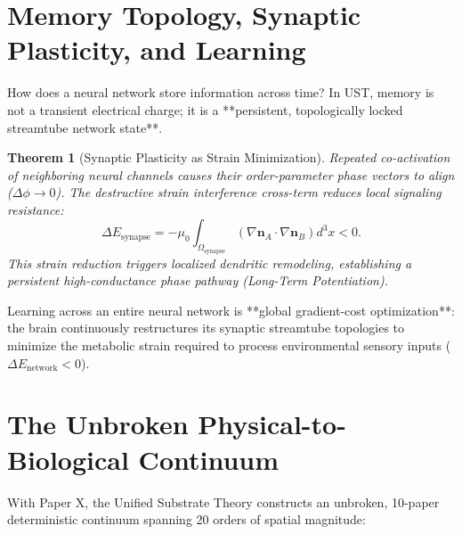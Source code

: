 \documentclass[11pt,a4paper]{article}
\newtheorem{thm}{Theorem}
\begin{document}
	\section{Memory Topology, Synaptic Plasticity, and Learning}
	\label{sec:memory_learning}
	
	How does a neural network store information across time? In UST, memory is not a transient electrical charge; it is a **persistent, topologically locked streamtube network state**.
	
	\begin{thm}[Synaptic Plasticity as Strain Minimization]
		\label{thm:learning_plasticity}
		Repeated co-activation of neighboring neural channels causes their order-parameter phase vectors to align ($\Delta \phi \to 0$). The destructive strain interference cross-term reduces local signaling resistance:
		\begin{equation}
			\Delta E_{\text{synapse}} = -\mu_0 \int_{\Omega_{\text{synapse}}} \left( \nabla \mathbf{n}_A \cdot \nabla \mathbf{n}_B \right) d^3x < 0.
		\end{equation}
		This strain reduction triggers localized dendritic remodeling, establishing a persistent high-conductance phase pathway (Long-Term Potentiation).
	\end{thm}
	
	Learning across an entire neural network is **global gradient-cost optimization**: the brain continuously restructures its synaptic streamtube topologies to minimize the metabolic strain required to process environmental sensory inputs ($\Delta E_{\text{network}} < 0$).
	
	\section{The Unbroken Physical-to-Biological Continuum}
	\label{sec:ten_paper_synthesis}
	
	With Paper X, the Unified Substrate Theory constructs an unbroken, 10-paper deterministic continuum spanning 20 orders of spatial magnitude:
	
\end{document}
